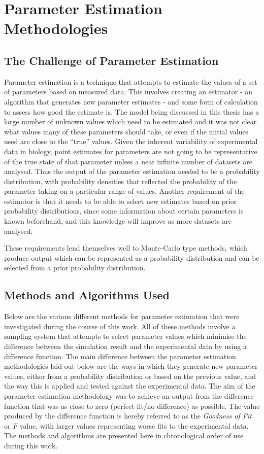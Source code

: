 \chapter{Parameter Estimation Methodologies}
\label{chap:paramest}

\section{The Challenge of Parameter Estimation}
Parameter estimation is a technique that attempts to estimate the values of a set of parameters based on measured data. This involves creating an estimator - an algorithm that generates new parameter estimates - and some form of calculation to assess how good the estimate is. The model being discussed in this thesis has a large number of unknown values which need to be estimated and it was not clear what values many of these parameters should take, or even if the initial values used are close to the ``true'' values. Given the inherent variability of experimental data in biology, point estimates for parameters are not going to be representative of the true state of that parameter unless a near infinite number of datasets are analysed. Thus the output of the parameter estimation needed to be a probability distribution, with probability densities that reflected the probability of the parameter taking on a particular range of values. Another requirement of the estimator is that it needs to be able to select new 
estimates based on prior probability distributions, since some information about certain parameters is known beforehand, and this
knowledge will improve as more datasets are analysed.

These requirements lend themselves well to Monte-Carlo type methods, which produce output which can be represented as a probability distribution and can be selected from a prior probability distribution.

\section{Methods and Algorithms Used}
Below are the various different methods for parameter estimation that were investigated during the course of this work. All of these methods involve a sampling system that attempts to select parameter values which minimise the difference between the simulation result and the experimental data by using a difference function. The main difference between the parameter estimation methodologies laid out below are the ways in which they generate new parameter values, either from a probability distribution or based on the previous value, and the way this is applied and tested against the experimental data. The aim of the parameter estimation methodology was to achieve an output from the difference function that was as close to zero (perfect fit/no difference) as possible. The value produced by the difference function is hereby referred to as the \textit{Goodness of Fit} or $F$ value, with larger values representing worse fits to the experimental data. The methods and algorithms are presented here in chronological 
order of use during this work.

